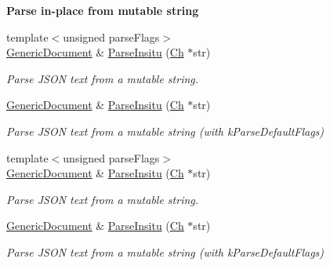\begin{Indent}\textbf{ Parse in-\/place from mutable string}\par
\begin{DoxyCompactItemize}
\item 
{\footnotesize template$<$unsigned parse\+Flags$>$ }\\\hyperlink{classGenericDocument}{Generic\+Document} \& \hyperlink{classGenericDocument_a301f8f297a5a0da4b6be5459ad766f75}{Parse\+Insitu} (\hyperlink{classGenericValue_ade0e0ce64ccd5d852da57a35e720bafb}{Ch} $\ast$str)
\begin{DoxyCompactList}\small\item\em Parse J\+S\+ON text from a mutable string. \end{DoxyCompactList}\item 
\hyperlink{classGenericDocument}{Generic\+Document} \& \hyperlink{classGenericDocument_a81922881357539d5482d31aea14b5664}{Parse\+Insitu} (\hyperlink{classGenericValue_ade0e0ce64ccd5d852da57a35e720bafb}{Ch} $\ast$str)
\begin{DoxyCompactList}\small\item\em Parse J\+S\+ON text from a mutable string (with k\+Parse\+Default\+Flags) \end{DoxyCompactList}\item 
{\footnotesize template$<$unsigned parse\+Flags$>$ }\\\hyperlink{classGenericDocument}{Generic\+Document} \& \hyperlink{classGenericDocument_a301f8f297a5a0da4b6be5459ad766f75}{Parse\+Insitu} (\hyperlink{classGenericValue_ade0e0ce64ccd5d852da57a35e720bafb}{Ch} $\ast$str)
\begin{DoxyCompactList}\small\item\em Parse J\+S\+ON text from a mutable string. \end{DoxyCompactList}\item 
\hyperlink{classGenericDocument}{Generic\+Document} \& \hyperlink{classGenericDocument_a81922881357539d5482d31aea14b5664}{Parse\+Insitu} (\hyperlink{classGenericValue_ade0e0ce64ccd5d852da57a35e720bafb}{Ch} $\ast$str)
\begin{DoxyCompactList}\small\item\em Parse J\+S\+ON text from a mutable string (with k\+Parse\+Default\+Flags) \end{DoxyCompactList}\end{DoxyCompactItemize}
\end{Indent}
